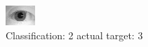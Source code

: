 \begin{figure}[h!]
\begin{center}
\includegraphics[width=0.60\columnwidth]{figures/ID1078_class_2_target_3.png}
\end{center}
\caption{ Classification: 2 actual target: 3}
\label{fig:ID1078_class_2_target_3}
\end{figure}
